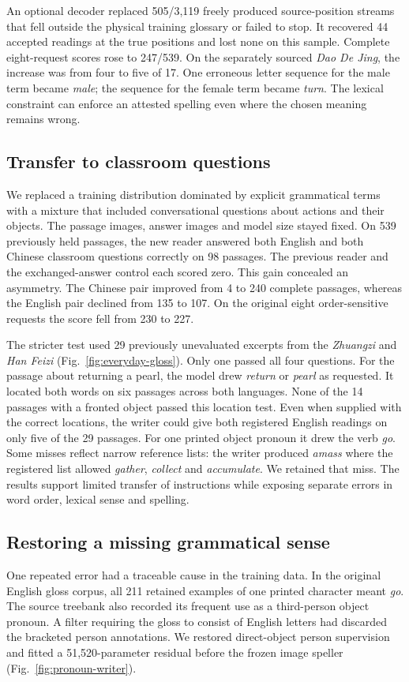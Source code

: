 \documentclass[12pt,a4paper]{article}
\providecommand{\DIFadd}[1]{{\protect\color{blue} \sf #1}} %
\begin{document}
\DIFadd{An optional decoder replaced 505/3,119 freely produced source-position streams that fell outside the physical training glossary or failed to stop. It recovered 44 accepted readings at the true positions and lost none on this sample. Complete eight-request scores rose to 247/539. On the separately sourced \textit{Dao De Jing}, the increase was from four to five of 17. One erroneous letter sequence for the male term became \textit{male}; the sequence for the female term became \textit{turn}. The lexical constraint can enforce an attested spelling even where the chosen meaning remains wrong.
}

\subsection*{\DIFadd{Transfer to classroom questions}}
\DIFadd{We replaced a training distribution dominated by explicit grammatical terms with a mixture that included conversational questions about actions and their objects. The passage images, answer images and model size stayed fixed. On 539 previously held passages, the new reader answered both English and both Chinese classroom questions correctly on 98 passages. The previous reader and the exchanged-answer control each scored zero. This gain concealed an asymmetry. The Chinese pair improved from 4 to 240 complete passages, whereas the English pair declined from 135 to 107. On the original eight order-sensitive requests the score fell from 230 to 227.
}

\DIFadd{The stricter test used 29 previously unevaluated excerpts from the \textit{Zhuangzi} and \textit{Han Feizi} (Fig.~\ref{fig:everyday-gloss}). Only one passed all four questions. For the passage about returning a pearl, the model drew \textit{return} or \textit{pearl} as requested. It located both words on six passages across both languages. None of the 14 passages with a fronted object passed this location test. Even when supplied with the correct locations, the writer could give both registered English readings on only five of the 29 passages. For one printed object pronoun it drew the verb \textit{go}. Some misses reflect narrow reference lists: the writer produced \textit{amass} where the registered list allowed \textit{gather}, \textit{collect} and \textit{accumulate}. We retained that miss. The results support limited transfer of instructions while exposing separate errors in word order, lexical sense and spelling.
}

\subsection*{\DIFadd{Restoring a missing grammatical sense}}
\DIFadd{One repeated error had a traceable cause in the training data. In the original English gloss corpus, all 211 retained examples of one printed character meant \textit{go}. The source treebank also recorded its frequent use as a third-person object pronoun. A filter requiring the gloss to consist of English letters had discarded the bracketed person annotations. We restored direct-object person supervision and fitted a 51,520-parameter residual before the frozen image speller (Fig.~\ref{fig:pronoun-writer}).
}
\end{document}
